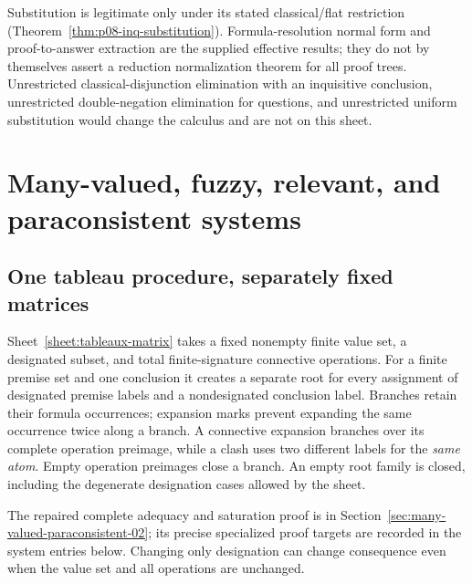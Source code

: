 Substitution is legitimate only under its stated classical/flat restriction
(Theorem~\ref{thm:p08-inq-substitution}).  Formula-resolution normal form and
proof-to-answer extraction are the supplied effective results; they do not
by themselves assert a reduction normalization theorem for all proof trees.
Unrestricted classical-disjunction elimination with an inquisitive
conclusion, unrestricted double-negation elimination for questions, and
unrestricted uniform substitution would change the calculus and are not
on this sheet.


\section{Many-valued, fuzzy, relevant, and paraconsistent systems}
\label{sec:p14-nonclassical-matrices-relevance}

\subsection{One tableau procedure, separately fixed matrices}

Sheet~\ref{sheet:tableaux-matrix} takes a fixed nonempty finite value set,
a designated subset, and total finite-signature connective operations.
For a finite premise set and one conclusion it creates a separate root for
every assignment of designated premise labels and a nondesignated conclusion
label.  Branches retain their formula occurrences; expansion marks prevent
expanding the same occurrence twice along a branch.  A connective expansion
branches over its complete operation preimage, while a clash uses two
different labels for the \emph{same atom}.  Empty operation preimages close
a branch.  An empty root family is closed, including the degenerate
designation cases allowed by the sheet.

The repaired complete adequacy and saturation proof is in
Section~\ref{sec:many-valued-paraconsistent-02}; its precise specialized
proof targets are recorded in the system entries below.  Changing only
designation can change consequence even when the value set and all operations
are unchanged.

